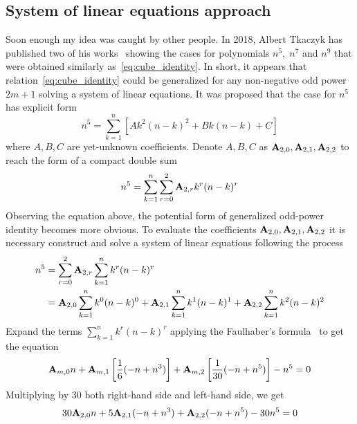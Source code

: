 \subsection{System of linear equations approach}\label{subsec:system-of-linear-equations-approach}
Soon enough my idea was caught by other people.
In 2018, Albert Tkaczyk has published two of his works~\cite{tkaczyk2018problem, tkaczyk2018continuation}
showing the cases for polynomials $n^5, \; n^7$ and $n^9$ that were obtained similarly as~\eqref{eq:cube_identity}.
In short, it appears that relation~\eqref{eq:cube_identity} could be generalized
for any non-negative odd power $2m+1$ solving a system of linear equations.
It was proposed that the case for $n^5$ has explicit form
\begin{equation*}
    n^5 = \sum_{k=1}^{n} \left[ A k^2(n-k)^2 + Bk(n-k) + C \right]
\end{equation*}
where $A,B,C$ are yet-unknown coefficients.
Denote $A,B,C$ as ${\mathbf{A}} \sb{2,0}, {\mathbf{A}} \sb{2,1}, {\mathbf{A}} \sb{2,2}$
to reach the form of a compact double sum
\begin{equation*}
    n^5 = \sum_{k=1}^{n} \sum_{r=0}^{2} {\mathbf{A}} \sb{2,r} k^r (n-k)^r
\end{equation*}
Observing the equation above, the potential form of generalized odd-power identity becomes more obvious.
To evaluate the coefficients ${\mathbf{A}} \sb{2,0}, {\mathbf{A}} \sb{2,1}, {\mathbf{A}} \sb{2,2}$
it is necessary construct and solve a system of linear equations following the process
\begin{equation*}
    \begin{split}
        n^5 &= \sum_{r=0}^{2} {\mathbf{A}} \sb{2,r} \sum_{k=1}^{n} k^r (n-k)^r \\
        &= {\mathbf{A}} \sb{2,0} \sum_{k=1}^{n} k^0 (n-k)^0 + {\mathbf{A}} \sb{2,1} \sum_{k=1}^{n} k^1 (n-k)^1 + {\mathbf{A}} \sb{2,2} \sum_{k=1}^{n} k^2 (n-k)^2
    \end{split}
\end{equation*}
Expand the terms $\sum_{k=1}^{n} k^r (n-k)^r$ applying the
Faulhaber's formula~\cite{beardon1996sums}
to get the equation
\begin{equation*}
    {\mathbf{A}} \sb{m,0} n
    + {\mathbf{A}} \sb{m,1} \left[ \frac{1}{6} (-n + n^3) \right]
    + {\mathbf{A}} \sb{m,2} \left[ \frac{1}{30} (-n + n^5) \right] - n^5 = 0
\end{equation*}
Multiplying by $30$ both right-hand side and left-hand side, we get
\begin{equation*}
    30 {\mathbf{A}} \sb{2,0} n + 5 {\mathbf{A}} \sb{2,1} (-n + n^3) + {\mathbf{A}} \sb{2,2} (-n + n^5) - 30n^5 = 0
\end{equation*}

